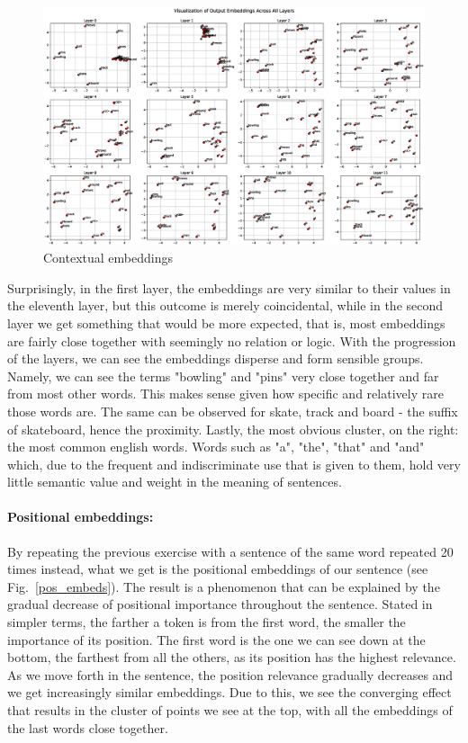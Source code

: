 \documentclass[runningheads]{llncs}
\begin{document}
\begin{figure}
\includegraphics[width=\textwidth]{hidden_layers.eps}
\caption{Contextual embeddings} \label{hidden_layers}
\end{figure}

Surprisingly, in the first layer, the embeddings are very similar to their values in the eleventh layer, but this outcome is merely coincidental, while in the second layer we get something that would be more expected, that is, most embeddings are fairly close together with seemingly no relation or logic. With the progression of the layers, we can see the embeddings disperse and form sensible groups. Namely, we can see the terms "bowling" and "pins" very close together and far from most other words. This makes sense given how specific and relatively rare those words are. The same can be observed for skate, track and board - the suffix of skateboard, hence the proximity. Lastly, the most obvious cluster, on the right: the most common english words. Words such as "a", "the", "that" and "and" which, due to the frequent and indiscriminate use that is given to them, hold very little semantic value and weight in the meaning of sentences.

\paragraph{Positional embeddings:}By repeating the previous exercise with a sentence of the same word repeated 20 times instead, what we get is the positional embeddings of our sentence (see Fig.~\ref{pos_embeds}). The result is a phenomenon that can be explained by the gradual decrease of positional importance throughout the sentence. Stated in simpler terms, the farther a token is from the first word, the smaller the importance of its position. The first word is the one we can see down at the bottom, the farthest from all the others, as its position has the highest relevance. As we move forth in the sentence, the position relevance gradually decreases and we get increasingly similar embeddings. Due to this, we see the converging effect that results in the cluster of points we see at the top, with all the embeddings of the last words close together.
\end{document}
